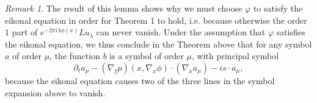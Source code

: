 \documentclass{article}
\theoremstyle{plain}
\theoremstyle{remark}
\newtheorem*{remark}{Remark}
\theoremstyle{definition}
\begin{document}
\begin{remark}
	The result of this lemma shows why we must choose $\varphi$ to satisfy the eikonal equation in order for Theorem 1 to hold, i.e. because otherwise the order $1$ part of $e^{-2 \pi i \lambda \phi(x)} L u_\lambda$ can never vanish. Under the assumption that $\varphi$ satisfies the eikonal equation, we thus conclude in the Theorem above that for any symbol $a$ of order $\mu$, the function $b$ is a symbol of order $\mu$, with principal symbol
	\[ \partial_t a_\mu -  (\nabla_\xi p)(x, \nabla_x \phi) \cdot (\nabla_x a_\mu) - i s \cdot a_\mu, \]
	because the eikonal equation causes two of the three lines in the symbol expansion above to vanish.
\end{remark}

\begin{comment}


\end{comment}
\end{document}
